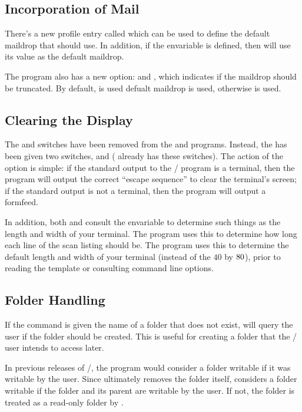 \subsection{Incorporation of Mail}
There's a new profile entry called  which can be used to define
the default maildrop that  should use.
In addition, if the envariable  is defined,
then  will use its value as the default maildrop.

The  program also has a new option:
 and ,
which indicates if the maildrop should be truncated.
By default,  is used defualt maildrop is used,
otherwise  is used.

\subsection{Clearing the Display}
The  and  switches have been removed from the
 and  programs.
Instead, the  has been given two switches,
 and 
( already has these switches).
The action of the  option is simple:
if the standard output to the \MH/ program is a terminal,
then the program will output the correct ``escape sequence'' to clear the
terminal's screen;
if the standard output is not a terminal,
then the program will output a formfeed.

In addition,
both  and  consult the  envariable to
determine such things as the length and width of your terminal.
The  program uses this to determine how long each line of the scan
listing should be.
The  program uses this to determine the default length and width
of your terminal (instead of the $40$ by $80\/$),
prior to reading the template or consulting command line options.

\subsection{Folder Handling}
If the  command is given the name of a folder that does not exist,
 will query the user if the folder should be created.
This is useful for creating a folder that the \MH/ user intends to access
later.

In previous releases of \MH/,
the  program would consider a folder writable if it was writable by
the user.
Since  ultimately removes the folder itself,
 considers a folder writable if the folder and its parent are
writable by the user.
If not, the folder is treated as a read-only folder by .

